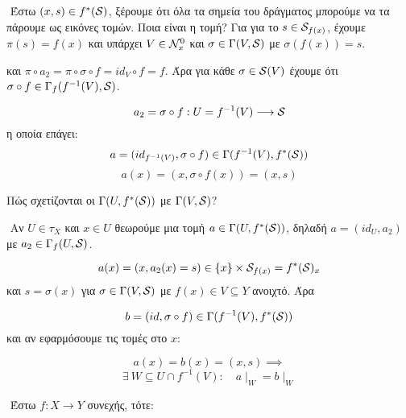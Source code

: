 $ $\newline
Έστω $(x,s) \in f^*(\mathcal{S})$, ξέρουμε ότι όλα τα σημεία του δράγματος μπορούμε να τα πάρουμε ως εικόνες τομών. Ποια είναι η τομή? Για για το $s \in \mathcal{S}_{f(x)}$, έχουμε $\pi(s) = f(x)$ και υπάρχει $V \in \mathcal{N}^0_x$ και $\sigma \in \Gamma(V,\mathcal{S})$ με $\sigma(f(x)) = s$.

\begin{figure}[H]
    \centering
\end{figure}

\noindent και $\pi\circ a_2 = \pi \circ \sigma \circ f = id_V \circ f = f$. Άρα για κάθε $\sigma \in \mathcal{S}(V)$ έχουμε ότι $\sigma \circ f \in \Gamma_f(f^{-1}(V),\mathcal{S})$.


$$a_2 = \sigma \circ f : U = f^{-1}(V) \longrightarrow \mathcal{S}$$ η οποία επάγει:
$$a = (id_{f^{-1}(V)},\sigma \circ f) \in \Gamma(f^{-1}(V), f^*(\mathcal{S}))$$
$$a(x) = (x,\sigma\circ f(x)) = (x,s)$$


\noindent Πώς σχετίζονται οι $\Gamma(U,f^*(\mathcal{S}))$ με $\Gamma (V,\mathcal{S})$?

$ $\newline
Αν $U \in \tau_X$ και $x \in U$ θεωρούμε μια τομή $a \in \Gamma(U,f^*(\mathcal{S}))$, δηλαδή $a = (id_U,a_2)$ με $a_2 \in \Gamma_f (U,\mathcal{S})$.

$$a(x) = (x,a_2(x)=s ) \in \{x\} \times \mathcal{S}_{f(x)} = f^*(\mathcal{S})_{x}$$ και $s = \sigma(x)$ για $\sigma \in \Gamma(V,\mathcal{S})$ με $f(x) \in V\subseteq Y$ ανοιχτό. Άρα

$$b = (id,\sigma \circ f) \in \Gamma(f^{-1}(V),f^*(\mathcal{S}))$$ και αν εφαρμόσουμε τις τομές στο $x$:

$$a(x) = b(x) = (x,s) \implies$$
$$\exists \ W \subseteq U \cap f^{-1}(V): \quad a\mid_W = b\mid_W$$



$ $\newline
Έστω $f:X \rightarrow Y$ συνεχής, τότε:
\begin{figure}[H]
    \centering
\end{figure}


